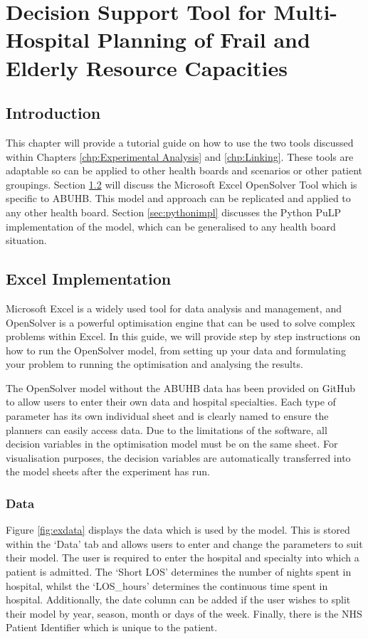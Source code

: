\documentclass[../thesis.tex]{subfiles}
\begin{document}
\chapter{Decision Support Tool for Multi-Hospital Planning of Frail and Elderly Resource Capacities}\label{chp:tool}

\section{Introduction}
This chapter will provide a tutorial guide on how to use the two tools discussed within Chapters \ref{chp:Experimental Analysis} and \ref{chp:Linking}. These tools are adaptable so can be applied to other health boards and scenarios or other patient groupings. Section \ref{sec:excelimp} will discuss the Microsoft Excel OpenSolver Tool which is specific to ABUHB. This model and approach can be replicated and applied to any other health board. Section \ref{sec:pythonimpl} discusses the Python PuLP implementation of the model, which can be generalised to any health board situation.


\section{Excel Implementation}\label{sec:excelimp}
Microsoft Excel is a widely used tool for data analysis and management, and OpenSolver is a powerful optimisation engine that can be used to solve complex problems within Excel. In this guide, we will provide step by step instructions on how to run the OpenSolver model, from setting up your data and formulating your problem to running the optimisation and analysing the results.

The OpenSolver model without the ABUHB data has been provided on GitHub \cite{Williams2023} to allow users to enter their own data and hospital specialties. Each type of parameter has its own individual sheet and is clearly named to ensure the planners can easily access data. Due to the limitations of the software, all decision variables in the optimisation model must be on the same sheet. For visualisation purposes, the decision variables are automatically transferred into the model sheets after the experiment has run.

\subsection*{Data}
Figure \ref{fig:exdata} displays the data which is used by the model. This is stored within the `Data' tab and allows users to enter and change the parameters to suit their model. The user is required to enter the hospital and specialty into which a patient is admitted. The `Short LOS' determines the number of nights spent in hospital, whilst the `LOS\_hours' determines the continuous time spent in hospital. Additionally, the date column can be added if the user wishes to split their model by year, season, month or days of the week. Finally, there is the NHS Patient Identifier which is unique to the patient.
\end{document}
